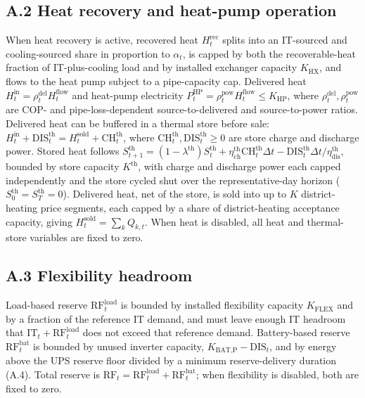 \documentclass[preprint,12pt]{elsarticle}
\begin{document}
\subsection*{A.2 Heat recovery and heat-pump operation}
When heat recovery is active, recovered heat $H^{\text{rec}}_t$ splits into an IT-sourced and cooling-sourced share in proportion to $\alpha_t$, is capped by both the recoverable-heat fraction of IT-plus-cooling load and by installed exchanger capacity $K_{\text{HX}}$, and flows to the heat pump subject to a pipe-capacity cap. Delivered heat $H^{\text{in}}_t=\rho^{\text{del}}_t H^{\text{flow}}_t$ and heat-pump electricity $P^{\text{HP}}_t=\rho^{\text{pow}}_t H^{\text{flow}}_t \le K_{\text{HP}}$, where $\rho^{\text{del}}_t,\rho^{\text{pow}}_t$ are COP- and pipe-loss-dependent source-to-delivered and source-to-power ratios. Delivered heat can be buffered in a thermal store before sale: $H^{\text{in}}_t + \text{DIS}^{\text{th}}_t = H^{\text{sold}}_t + \text{CH}^{\text{th}}_t$, where $\text{CH}^{\text{th}}_t,\text{DIS}^{\text{th}}_t\ge0$ are store charge and discharge power. Stored heat follows $S^{\text{th}}_{t+1}=(1-\lambda^{\text{th}})S^{\text{th}}_t+\eta^{\text{th}}_{\text{ch}}\text{CH}^{\text{th}}_t\Delta t-\text{DIS}^{\text{th}}_t\Delta t/\eta^{\text{th}}_{\text{dis}}$, bounded by store capacity $K^{\text{th}}$, with charge and discharge power each capped independently and the store cycled shut over the representative-day horizon ($S^{\text{th}}_0=S^{\text{th}}_T=0$). Delivered heat, net of the store, is sold into up to $K$ district-heating price segments, each capped by a share of district-heating acceptance capacity, giving $H^{\text{sold}}_t=\sum_k Q_{k,t}$. When heat is disabled, all heat and thermal-store variables are fixed to zero.

\subsection*{A.3 Flexibility headroom}
Load-based reserve $\text{RF}^{\text{load}}_t$ is bounded by installed flexibility capacity $K_{\text{FLEX}}$ and by a fraction of the reference IT demand, and must leave enough IT headroom that $\text{IT}_t+\text{RF}^{\text{load}}_t$ does not exceed that reference demand. Battery-based reserve $\text{RF}^{\text{bat}}_t$ is bounded by unused inverter capacity, $K_{\text{BAT,P}}-\text{DIS}_t$, and by energy above the UPS reserve floor divided by a minimum reserve-delivery duration (A.4). Total reserve is $\text{RF}_t=\text{RF}^{\text{load}}_t+\text{RF}^{\text{bat}}_t$; when flexibility is disabled, both are fixed to zero.
\end{document}
